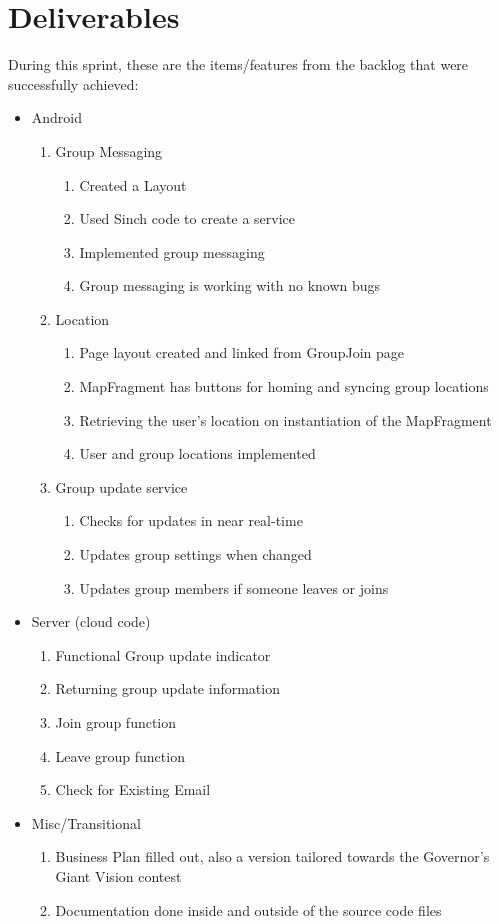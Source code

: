 \documentclass[11pt]{article}
\begin{document}
\section*{Deliverables}
During this sprint, these are the items/features from the backlog that were successfully achieved:
	\begin{itemize}
	\item Android
		\begin{enumerate}
		\item Group Messaging
			\begin{enumerate}
			\item Created a Layout
			\item Used Sinch code to create a service
			\item Implemented group messaging
			\item Group messaging is working with no known bugs
			\end{enumerate}
		\item Location
			\begin{enumerate}
			\item Page layout created and linked from GroupJoin page
			\item MapFragment has buttons for homing and syncing group locations
			\item Retrieving the user's location on instantiation of the MapFragment
			\item User and group locations implemented
			\end{enumerate}
		\item Group update service
			\begin{enumerate}
			\item Checks for updates in near real-time
			\item Updates group settings when changed
			\item Updates group members if someone leaves or joins
			\end{enumerate}
		\end{enumerate}

	\item Server (cloud code)
		\begin{enumerate}
			\item Functional Group update indicator
			\item Returning group update information
			\item Join group function
			\item Leave group function
			\item Check for Existing Email
		\end{enumerate}
		
	\item Misc/Transitional
		\begin{enumerate}
			\item Business Plan filled out, also a version tailored towards the Governor's Giant Vision contest
			\item Documentation done inside and outside of the source code files
		\end{enumerate}

	\end{itemize}
\end{document}
